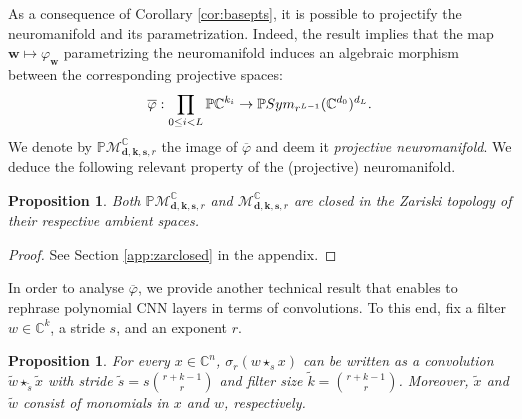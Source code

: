 \documentclass[twoside]{article}
\theoremstyle{plain}%
\newtheorem{prop}[thm]{Proposition}
\theoremstyle{definition}
\theoremstyle{remark}
\newcommand{\symmm}[2]{\textnormal{Sym}_{#1}(#2)}
\newcommand{\conv}[1]{\star_{#1}}
\begin{document}
As a consequence of Corollary \ref{cor:basepts}, it is possible to projectify the neuromanifold and its parametrization. Indeed, the result implies that the map $\mathbf{w} \mapsto \varphi_\mathbf{w}$ parametrizing the neuromanifold induces an algebraic morphism between the corresponding projective spaces: 
\begin{equation}\label{eq:projsegver}
    \overline{\varphi}:\prod_{0 \leq i < L} \mathbb{P} \mathbb{C}^{k_i} \rightarrow  
    \mathbb{P} \symmm{r^{L-1}}{\mathbb{C}^{d_0}}^{d_L}.  
\end{equation} 
We denote by $\mathbb{P}\mathcal{M}_{\mathbf{d}, \mathbf{k}, \mathbf{s}, r}^\mathbb{C}$ the image of $\overline{\varphi}$ and deem it \emph{projective neuromanifold}. We deduce the following relevant property of the (projective) neuromanifold. 
\begin{prop}\label{prop:zarclosed}
Both $\mathbb{P}\mathcal{M}_{\mathbf{d}, \mathbf{k}, \mathbf{s}, r}^\mathbb{C}$ and $\mathcal{M}_{\mathbf{d}, \mathbf{k}, \mathbf{s}, r}^\mathbb{C}$ are closed in the Zariski topology of their respective ambient spaces. 
\end{prop}
\begin{proof}
See Section \ref{app:zarclosed} in the appendix. 
\end{proof}
In order to analyse $\overline{\varphi}$, we provide another technical result that enables to rephrase polynomial CNN layers in terms of convolutions. To this end, fix a filter $w \in \mathbb{C}^k$, a stride $s$, and an exponent $r$. 
\begin{prop}\label{prop:converonese}
 For every $x \in \mathbb{C}^n$, $\sigma_r(w \conv{s} x)$ can be written as a convolution $\tilde{w} \conv{\tilde{s}} \tilde{x}$ with stride $\tilde{s} = s \binom{r+k-1}{r}$ and
filter size  $\tilde{k}=\binom{r+k-1}{r}$. Moreover, $\tilde{x}$ and $\tilde{w}$ consist of monomials in $x$ and $w$, respectively.  
\end{prop}
\end{document}
